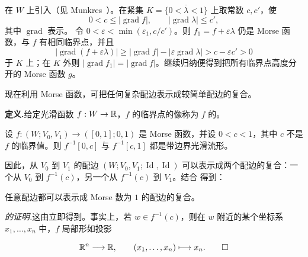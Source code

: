 在 $W$ 上引入（见 Munkres~\cite[p.~24]{ref05}）。在紧集 $K=\overline{\{0<\lambda<1\}}$ 上取常数 $c,c'$，使
\[
  0<c\leq|\operatorname{grad}f|,\qquad |\operatorname{grad}\lambda|\leq c',
\]
其中 $\operatorname{grad}$ 表示。
令 $0<\varepsilon<\min(\varepsilon_1,c/c')$。则 $f_1=f+\varepsilon\lambda$ 仍是 Morse 函数，与 $f$ 有相同临界点，并且
\[
 |\operatorname{grad}(f+\varepsilon\lambda)|
 \geq|\operatorname{grad}f|-|\varepsilon\operatorname{grad}\lambda|
 >c-\varepsilon c'>0
\]
于 $K$ 上；在 $K$ 外则 $|\operatorname{grad}f_1|=|\operatorname{grad}f|$。继续归纳便得到把所有临界点高度分开的 Morse 函数 $g$。
\EndProof

现在利用 Morse 函数，可把任何复杂配边表示成较简单配边的复合。

\par\medskip\noindent\textbf{定义.}\quad 给定光滑函数 $f:W\to\mathbb{R}$，$f$ 的临界点的像称为 $f$ 的\emph{}。

设 $f:(W;V_0,V_1)\to([0,1];0,1)$ 是 Morse 函数，并设 $0<c<1$，其中 $c$ 不是 $f$ 的临界值。则 $f^{-1}[0,c]$ 与 $f^{-1}[c,1]$ 都是带边界光滑流形。

因此，从 $V_0$ 到 $V_1$ 的配边 $(W;V_0,V_1;\operatorname{Id},\operatorname{Id})$ 可以表示成两个配边的复合：一个从 $V_0$ 到 $f^{-1}(c)$，另一个从 $f^{-1}(c)$ 到 $V_1$。结合 得到：

任意配边都可以表示成 Morse 数为 $1$ 的配边的复合。

\par\medskip\noindent\textit{ 的证明.}\quad 这由立即得到。事实上，若 $w\in f^{-1}(c)$，则在 $w$ 附近的某个坐标系 $x_1,\ldots,x_n$ 中，$f$ 局部形如投影
\begin{MilnorProofEnd}
\[
  \mathbb{R}^n\longrightarrow\mathbb{R},\qquad(x_1,\ldots,x_n)\longmapsto x_n.\qedhere
\]
\end{MilnorProofEnd}
